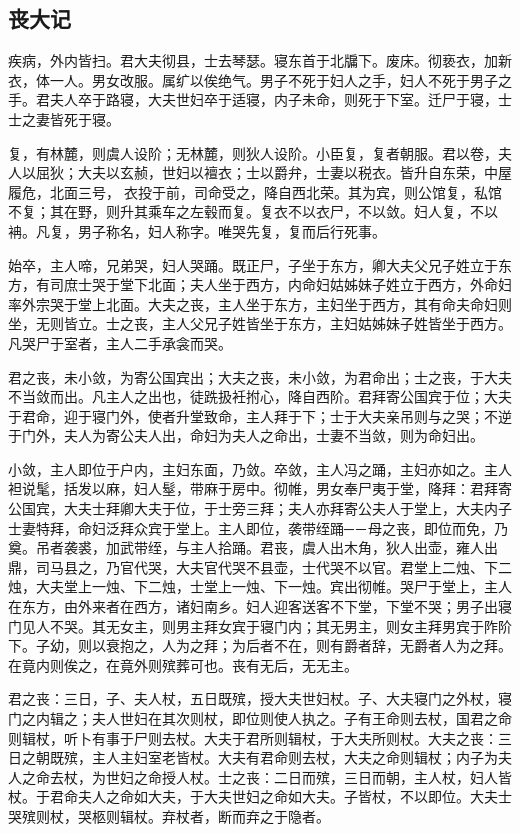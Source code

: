 \documentclass[]{article}
\begin{document}
\hypertarget{header-n606}{%
\subsection{丧大记}\label{header-n606}}

疾病，外内皆扫。君大夫彻县，士去琴瑟。寝东首于北牖下。废床。彻亵衣，加新衣，体一人。男女改服。属纩以俟绝气。男子不死于妇人之手，妇人不死于男子之手。君夫人卒于路寝，大夫世妇卒于适寝，内子未命，则死于下室。迁尸于寝，士士之妻皆死于寝。

复，有林麓，则虞人设阶；无林麓，则狄人设阶。小臣复，复者朝服。君以卷，夫人以屈狄；大夫以玄赪，世妇以襢衣；士以爵弁，士妻以税衣。皆升自东荣，中屋履危，北面三号，衣投于前，司命受之，降自西北荣。其为宾，则公馆复，私馆不复；其在野，则升其乘车之左毂而复。复衣不以衣尸，不以敛。妇人复，不以袡。凡复，男子称名，妇人称字。唯哭先复，复而后行死事。

始卒，主人啼，兄弟哭，妇人哭踊。既正尸，子坐于东方，卿大夫父兄子姓立于东方，有司庶士哭于堂下北面；夫人坐于西方，内命妇姑姊妹子姓立于西方，外命妇率外宗哭于堂上北面。大夫之丧，主人坐于东方，主妇坐于西方，其有命夫命妇则坐，无则皆立。士之丧，主人父兄子姓皆坐于东方，主妇姑姊妹子姓皆坐于西方。凡哭尸于室者，主人二手承衾而哭。

君之丧，未小敛，为寄公国宾出；大夫之丧，未小敛，为君命出；士之丧，于大夫不当敛而出。凡主人之出也，徒跣扱衽拊心，降自西阶。君拜寄公国宾于位；大夫于君命，迎于寝门外，使者升堂致命，主人拜于下；士于大夫亲吊则与之哭；不逆于门外，夫人为寄公夫人出，命妇为夫人之命出，士妻不当敛，则为命妇出。

小敛，主人即位于户内，主妇东面，乃敛。卒敛，主人冯之踊，主妇亦如之。主人袒说髦，括发以麻，妇人髽，带麻于房中。彻帷，男女奉尸夷于堂，降拜：君拜寄公国宾，大夫士拜卿大夫于位，于士旁三拜；夫人亦拜寄公夫人于堂上，大夫内子士妻特拜，命妇泛拜众宾于堂上。主人即位，袭带绖踊─－母之丧，即位而免，乃奠。吊者袭裘，加武带绖，与主人拾踊。君丧，虞人出木角，狄人出壶，雍人出鼎，司马县之，乃官代哭，大夫官代哭不县壶，士代哭不以官。君堂上二烛、下二烛，大夫堂上一烛、下二烛，士堂上一烛、下一烛。宾出彻帷。哭尸于堂上，主人在东方，由外来者在西方，诸妇南乡。妇人迎客送客不下堂，下堂不哭；男子出寝门见人不哭。其无女主，则男主拜女宾于寝门内；其无男主，则女主拜男宾于阼阶下。子幼，则以衰抱之，人为之拜；为后者不在，则有爵者辞，无爵者人为之拜。在竟内则俟之，在竟外则殡葬可也。丧有无后，无无主。

君之丧：三日，子、夫人杖，五日既殡，授大夫世妇杖。子、大夫寝门之外杖，寝门之内辑之；夫人世妇在其次则杖，即位则使人执之。子有王命则去杖，国君之命则辑杖，听卜有事于尸则去杖。大夫于君所则辑杖，于大夫所则杖。大夫之丧：三日之朝既殡，主人主妇室老皆杖。大夫有君命则去杖，大夫之命则辑杖；内子为夫人之命去杖，为世妇之命授人杖。士之丧：二日而殡，三日而朝，主人杖，妇人皆杖。于君命夫人之命如大夫，于大夫世妇之命如大夫。子皆杖，不以即位。大夫士哭殡则杖，哭柩则辑杖。弃杖者，断而弃之于隐者。
\end{document}
